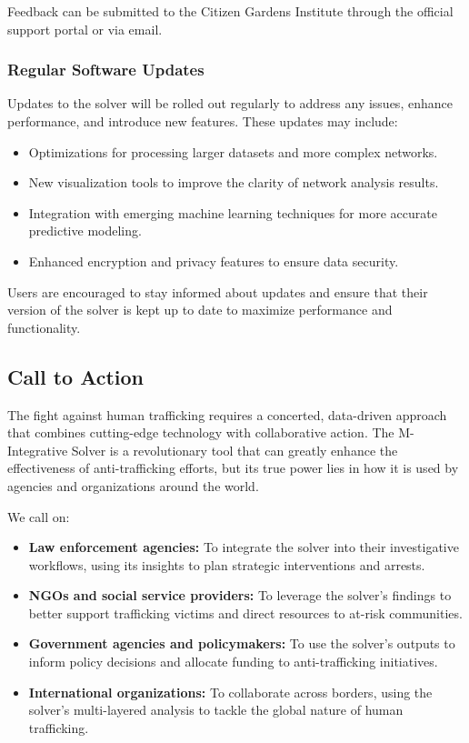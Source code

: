 \documentclass[%
 preprint, linenumbers,
 amsmath,amssymb,
 aps, physrev,
]{revtex4-2}
\begin{document}
Feedback can be submitted to the Citizen Gardens Institute through the official support portal or via email.

\subsubsection{Regular Software Updates}

Updates to the solver will be rolled out regularly to address any issues, enhance performance, and introduce new features. These updates may include:
\begin{itemize}
    \item Optimizations for processing larger datasets and more complex networks.
    \item New visualization tools to improve the clarity of network analysis results.
    \item Integration with emerging machine learning techniques for more accurate predictive modeling.
    \item Enhanced encryption and privacy features to ensure data security.
\end{itemize}

Users are encouraged to stay informed about updates and ensure that their version of the solver is kept up to date to maximize performance and functionality.

\subsection{Call to Action}

The fight against human trafficking requires a concerted, data-driven approach that combines cutting-edge technology with collaborative action. The M-Integrative Solver is a revolutionary tool that can greatly enhance the effectiveness of anti-trafficking efforts, but its true power lies in how it is used by agencies and organizations around the world.

We call on:
\begin{itemize}
    \item \textbf{Law enforcement agencies:} To integrate the solver into their investigative workflows, using its insights to plan strategic interventions and arrests.
    \item \textbf{NGOs and social service providers:} To leverage the solver’s findings to better support trafficking victims and direct resources to at-risk communities.
    \item \textbf{Government agencies and policymakers:} To use the solver’s outputs to inform policy decisions and allocate funding to anti-trafficking initiatives.
    \item \textbf{International organizations:} To collaborate across borders, using the solver’s multi-layered analysis to tackle the global nature of human trafficking.
\end{itemize}
\end{document}
